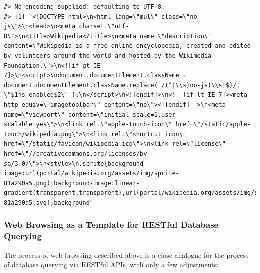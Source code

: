 \documentclass[]{book}
\begin{document}
\begin{verbatim}
#> No encoding supplied: defaulting to UTF-8.
#> [1] "<!DOCTYPE html>\n<html lang=\"mul\" class=\"no-js\">\n<head>\n<meta charset=\"utf-8\">\n<title>Wikipedia</title>\n<meta name=\"description\" content=\"Wikipedia is a free online encyclopedia, created and edited by volunteers around the world and hosted by the Wikimedia Foundation.\">\n<![if gt IE 7]>\n<script>\ndocument.documentElement.className = document.documentElement.className.replace( /(^|\\s)no-js(\\s|$)/, \"$1js-enabled$2\" );\n</script>\n<![endif]>\n<!--[if lt IE 7]><meta http-equiv=\"imagetoolbar\" content=\"no\"><![endif]-->\n<meta name=\"viewport\" content=\"initial-scale=1,user-scalable=yes\">\n<link rel=\"apple-touch-icon\" href=\"/static/apple-touch/wikipedia.png\">\n<link rel=\"shortcut icon\" href=\"/static/favicon/wikipedia.ico\">\n<link rel=\"license\" href=\"//creativecommons.org/licenses/by-sa/3.0/\">\n<style>\n.sprite{background-image:url(portal/wikipedia.org/assets/img/sprite-81a290a5.png);background-image:linear-gradient(transparent,transparent),url(portal/wikipedia.org/assets/img/sprite-81a290a5.svg);background"
\end{verbatim}

\hypertarget{web-browsing-as-a-template-for-restful-database-querying}{%
\subsubsection*{Web Browsing as a Template for RESTful Database Querying}\label{web-browsing-as-a-template-for-restful-database-querying}}

The process of web browsing described above is a close analogue for the process of database querying via RESTful APIs, with only a few adjustments:
\end{document}
